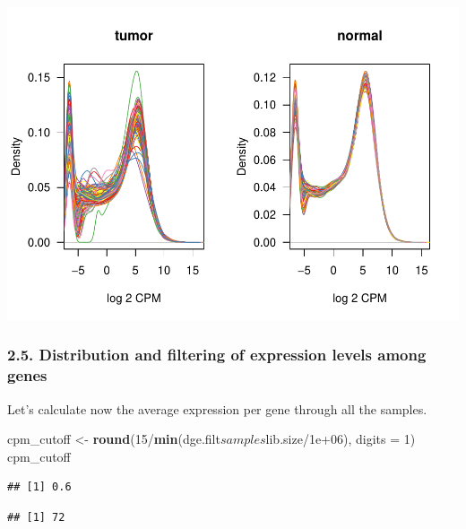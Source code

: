 \documentclass[]{article}
\newenvironment{Shaded}{\begin{snugshade}}{\end{snugshade}}
\newcommand{\KeywordTok}[1]{\textcolor[rgb]{0.13,0.29,0.53}{\textbf{{#1}}}}
\newcommand{\DataTypeTok}[1]{\textcolor[rgb]{0.13,0.29,0.53}{{#1}}}
\newcommand{\DecValTok}[1]{\textcolor[rgb]{0.00,0.00,0.81}{{#1}}}
\newcommand{\FloatTok}[1]{\textcolor[rgb]{0.00,0.00,0.81}{{#1}}}
\newcommand{\StringTok}[1]{\textcolor[rgb]{0.31,0.60,0.02}{{#1}}}
\newcommand{\NormalTok}[1]{{#1}}
\begin{document}
\includegraphics{IEO_project_files/figure-latex/Distribution of expression levels among samples-1.pdf}

\subsubsection{2.5. Distribution and filtering of expression levels
among
genes}\label{distribution-and-filtering-of-expression-levels-among-genes}

Let's calculate now the average expression per gene through all the
samples.

\begin{Shaded}
\begin{Highlighting}[]
\NormalTok{cpm_cutoff <-}\StringTok{ }\KeywordTok{round}\NormalTok{(}\DecValTok{15}\NormalTok{/}\KeywordTok{min}\NormalTok{(dge.filt$samples$lib.size/}\FloatTok{1e+06}\NormalTok{), }\DataTypeTok{digits =} \DecValTok{1}\NormalTok{)}
\NormalTok{cpm_cutoff}
\end{Highlighting}
\end{Shaded}

\begin{verbatim}
## [1] 0.6
\end{verbatim}

\begin{Shaded}
\end{Shaded}

\begin{verbatim}
## [1] 72
\end{verbatim}
\end{document}
